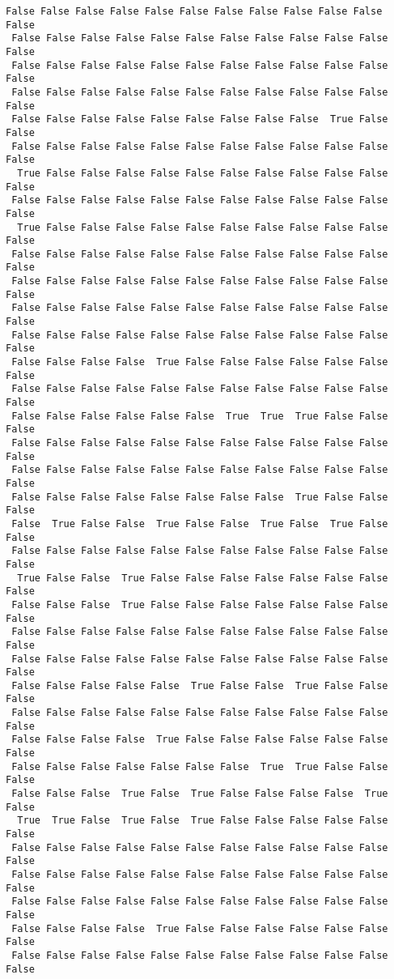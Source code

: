 \documentclass[11pt]{article}
\begin{document}
\begin{Verbatim}[commandchars=\\\{\}]
 False False False False False False False False False False False False
 False False False False False False False False False False False False
 False False False False False False False False False False False False
 False False False False False False False False False False False False
 False False False False False False False False False  True False False
 False False False False False False False False False False False False
  True False False False False False False False False False False False
 False False False False False False False False False False False False
  True False False False False False False False False False False False
 False False False False False False False False False False False False
 False False False False False False False False False False False False
 False False False False False False False False False False False False
 False False False False False False False False False False False False
 False False False False  True False False False False False False False
 False False False False False False False False False False False False
 False False False False False False  True  True  True False False False
 False False False False False False False False False False False False
 False False False False False False False False False False False False
 False False False False False False False False  True False False False
 False  True False False  True False False  True False  True False False
 False False False False False False False False False False False False
  True False False  True False False False False False False False False
 False False False  True False False False False False False False False
 False False False False False False False False False False False False
 False False False False False False False False False False False False
 False False False False False  True False False  True False False False
 False False False False False False False False False False False False
 False False False False  True False False False False False False False
 False False False False False False False  True  True False False False
 False False False  True False  True False False False False  True False
  True  True False  True False  True False False False False False False
 False False False False False False False False False False False False
 False False False False False False False False False False False False
 False False False False False False False False False False False False
 False False False False  True False False False False False False False
 False False False False False False False False False False False False

\end{Verbatim}
\end{document}
